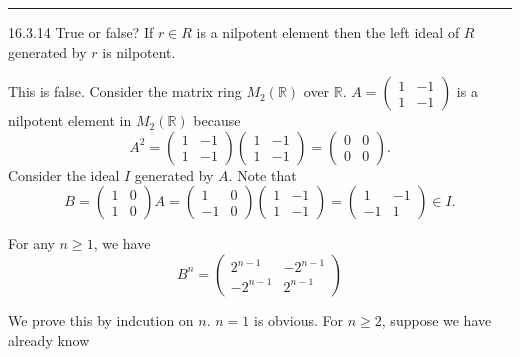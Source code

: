 \documentclass[a4paper, 12pt]{article}
\begin{document}
\noindent\rule{7in}{2.8pt}
\begin{problem}{16.3.14}
True or false? If \(r\in R\) is a nilpotent element then the left ideal of \(R\) generated by \(r\) is nilpotent.
\end{problem}
\begin{solution}
This is false. Consider the matrix ring \(M_2(\mathbb{R})\) over \(\mathbb{R}\). \(A=\begin{pmatrix}
    1&-1\\ 
    1&-1
\end{pmatrix}\) is a nilpotent element in \(M_2(\mathbb{R})\) because 
\[A^2=\begin{pmatrix}
    1&-1\\ 
    1&-1
\end{pmatrix}\begin{pmatrix}
    1&-1\\ 
    1&-1
\end{pmatrix}=\begin{pmatrix}
    0&0\\ 
    0&0
\end{pmatrix}.\]
Consider the ideal \(I\) generated by \(A\). Note that 
\[B=\begin{pmatrix}
    1&0\\ 
    1&0
\end{pmatrix}A=\begin{pmatrix}
    1&0\\ 
    -1&0
\end{pmatrix}\begin{pmatrix}
    1&-1\\ 
    1&-1
\end{pmatrix}=\begin{pmatrix}
    1&-1\\ 
    -1&1
\end{pmatrix}\in I.\]
\begin{claim}
For any \(n\geq 1\), we have 
\[B^n=\begin{pmatrix}
    2^{n-1}&-2^{n-1}\\ 
    -2^{n-1}&2^{n-1}
\end{pmatrix}\]
\end{claim}
\begin{claimproof}
We prove this by indcution on \(n\). \(n=1\) is obvious. For \(n\geq 2\), suppose we have already know 

\end{claimproof}
\end{solution}
\end{document}
